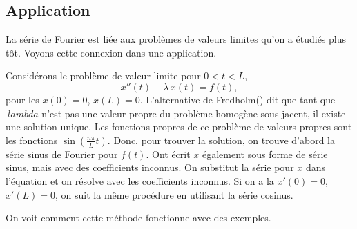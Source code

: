 \subsection{Application}

La série de Fourier est liée aux problèmes de valeurs limites
qu'on a étudiés plus tôt. Voyons cette connexion dans une application.

Considérons le problème de valeur limite pour $0 < t < L$,
\begin{equation*}
x''(t) + \lambda\, x(t) = f(t) ,
\end{equation*}
pour les \emph{}
$x(0) = 0$, $x(L) = 0$.
L'alternative de Fredholm()
dit que tant que $ \ lambda $ n'est pas une valeur propre du problème homogène sous-jacent, il existe une solution unique.
Les fonctions propres de ce problème de valeurs propres sont les fonctions
$\sin \left( \frac{n \pi}{L} t \right)$.
Donc, pour trouver la solution, on trouve d'abord la série sinus de Fourier pour $ f (t) $.
Ont écrit $ x $ également sous forme de série sinus, mais avec des coefficients inconnus.
On substitut la série pour $ x $ dans l'équation et on résolve avec les coefficients inconnus.
Si on a
la \emph{}
$x'(0) = 0$, $x'(L) = 0$, on suit la même procédure en utilisant la série cosinus.

On voit comment cette méthode fonctionne avec des exemples.

